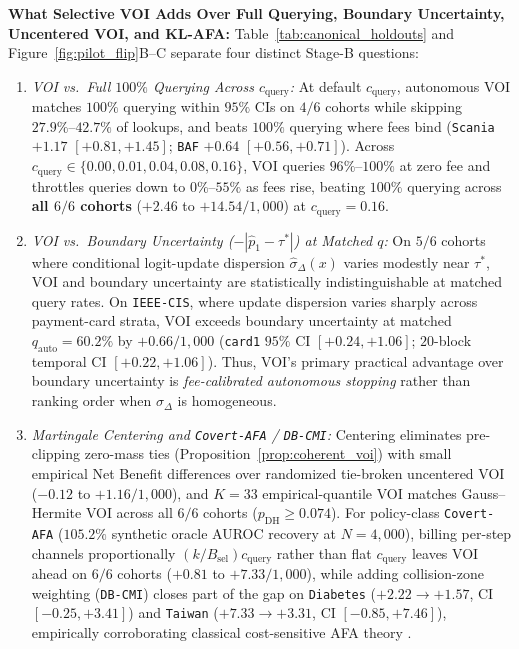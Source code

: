 \documentclass[11pt]{article}
\theoremstyle{remark}
\begin{document}
\textbf{What Selective VOI Adds Over Full Querying, Boundary Uncertainty, Uncentered VOI, and KL-AFA:} Table~\ref{tab:canonical_holdouts} and Figure~\ref{fig:pilot_flip}B--C separate four distinct Stage-B questions:
\begin{enumerate}
  \item \emph{VOI vs.\ Full $100\%$ Querying Across $c_{\text{query}}$:} At default $c_{\text{query}}$, autonomous VOI matches $100\%$ querying within $95\%$ CIs on $4/6$ cohorts while skipping $27.9\%\text{--}42.7\%$ of lookups, and beats $100\%$ querying where fees bind (\texttt{Scania} $+1.17$ $[+0.81, +1.45]$; \texttt{BAF} $+0.64$ $[+0.56, +0.71]$). Across $c_{\text{query}} \in \{0.00, 0.01, 0.04, 0.08, 0.16\}$, VOI queries $96\%\text{--}100\%$ at zero fee and throttles queries down to $0\%\text{--}55\%$ as fees rise, beating $100\%$ querying across \textbf{all $6/6$ cohorts} ($+2.46$ to $+14.54/1{,}000$) at $c_{\text{query}} = 0.16$.
  \item \emph{VOI vs.\ Boundary Uncertainty ($-|\hat{p}_1 - \tau^*|$) at Matched $q$:} On $5/6$ cohorts where conditional logit-update dispersion $\hat{\sigma}_{\Delta}(x)$ varies modestly near $\tau^*$, VOI and boundary uncertainty are statistically indistinguishable at matched query rates. On \texttt{IEEE-CIS}, where update dispersion varies sharply across payment-card strata, VOI exceeds boundary uncertainty at matched $q_{\text{auto}} = 60.2\%$ by $+0.66/1{,}000$ (\texttt{card1} $95\%$ CI $[+0.24, +1.06]$; $20$-block temporal CI $[+0.22, +1.06]$). Thus, VOI's primary practical advantage over boundary uncertainty is \emph{fee-calibrated autonomous stopping} rather than ranking order when $\hat{\sigma}_{\Delta}$ is homogeneous.
  \item \emph{Martingale Centering and \texttt{Covert-AFA} / \texttt{DB-CMI}:} Centering eliminates pre-clipping zero-mass ties (Proposition~\ref{prop:coherent_voi}) with small empirical Net Benefit differences over randomized tie-broken uncentered VOI ($-0.12$ to $+1.16/1{,}000$), and $K=33$ empirical-quantile VOI matches Gauss--Hermite VOI across all $6/6$ cohorts ($p_{\text{DH}} \ge 0.074$). For policy-class \texttt{Covert-AFA} ($105.2\%$ synthetic oracle AUROC recovery at $N=4{,}000$), billing per-step channels proportionally $(k/B_{\text{sel}})c_{\text{query}}$ rather than flat $c_{\text{query}}$ leaves VOI ahead on $6/6$ cohorts ($+0.81$ to $+7.33/1{,}000$), while adding collision-zone weighting (\texttt{DB-CMI}) closes part of the gap on \texttt{Diabetes} ($+2.22 \to +1.57$, CI $[-0.25, +3.41]$) and \texttt{Taiwan} ($+7.33 \to +3.31$, CI $[-0.85, +7.46]$), empirically corroborating classical cost-sensitive AFA theory \citep{ji2007cost,bilgic2011value}.
\end{enumerate}
\end{document}
